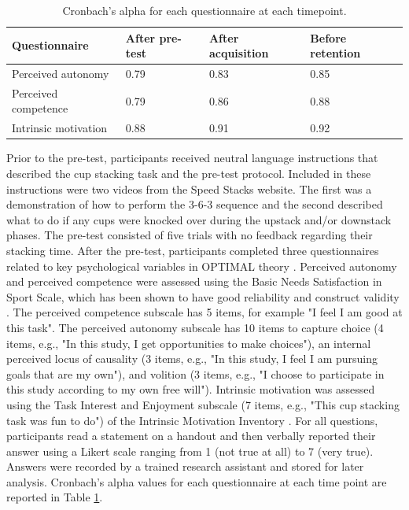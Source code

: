 \documentclass[doc,floatsintext,donotrepeattitle,letterpaper,12pt]{apa7}
\begin{document}
\begin{table}[htb]
    \caption{Cronbach's alpha for each questionnaire at each timepoint.}
    \label{tab:table1}
    \small
    \begin{tabular}{@{}llll@{}}
    \toprule
    Questionnaire        & After pre-test & After acquisition & Before retention \\
    \midrule
    Perceived autonomy   & 0.79           & 0.83              & 0.85             \\
    Perceived competence & 0.79           & 0.86              & 0.88             \\
    Intrinsic motivation & 0.88           & 0.91              & 0.92             \\
    \bottomrule
    \end{tabular}
\end{table}

Prior to the pre-test, participants received neutral language instructions that described the cup stacking task and the pre-test protocol. Included in these instructions were two videos from the Speed Stacks website. The first was a demonstration of how to perform the 3-6-3 sequence and the second described what to do if any cups were knocked over during the upstack and/or downstack phases. The pre-test consisted of five trials with no feedback regarding their stacking time. After the pre-test, participants completed three questionnaires related to key psychological variables in OPTIMAL theory \autocite{wulf2016}. Perceived autonomy and perceived competence were assessed using the Basic Needs Satisfaction in Sport Scale, which has been shown to have good reliability and construct validity \autocite{ng2011}. The perceived competence subscale has 5 items, for example "I feel I am good at this task". The perceived autonomy subscale has 10 items to capture choice (4 items, e.g., "In this study, I get opportunities to make choices"), an internal perceived locus of causality (3 items, e.g., "In this study, I feel I am pursuing goals that are my own"), and volition (3 items, e.g., "I choose to participate in this study according to my own free will"). Intrinsic motivation was assessed using the Task Interest and Enjoyment subscale (7 items, e.g., "This cup stacking task was fun to do") of the Intrinsic Motivation Inventory \autocite{mcauley1989}. For all questions, participants read a statement on a handout and then verbally reported their answer using a Likert scale ranging from 1 (not true at all) to 7 (very true). Answers were recorded by a trained research assistant and stored for later analysis. Cronbach's alpha values for each questionnaire at each time point are reported in Table \ref{tab:table1}.
\end{document}

